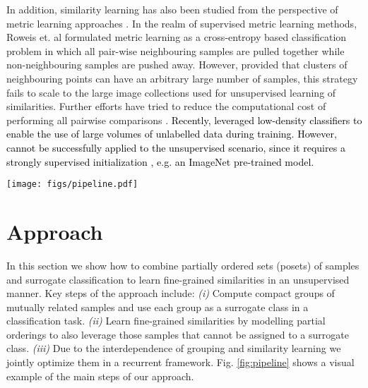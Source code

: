 \documentclass[10pt,twocolumn,letterpaper]{article}
\begin{document}
In addition, similarity learning has also been studied from the perspective of metric learning approaches \cite{wsabie,nca,magnet}. In the realm of supervised metric learning methods, Roweis et. al \cite{nca} formulated metric learning as a cross-entropy based classification problem in which all pair-wise neighbouring samples are pulled together while non-neighbouring samples are pushed away. However, provided that clusters of neighbouring points can have an arbitrary large number of samples, this strategy fails to scale to the large image collections used for unsupervised learning of similarities. Further efforts \cite{nca_ext1,nca_ext2} have tried to reduce the computational cost of performing all pairwise comparisons \cite{nmc}. \textcolor{black}{Recently, \cite{lowdensity} leveraged low-density classifiers to enable the use of large volumes of unlabelled data during training. However, \cite{lowdensity} cannot be successfully applied to the unsupervised scenario, since it requires a strongly supervised initialization , e.g. an ImageNet pre-trained model.}

\begin{figure*}[ht]
\texttt{[image: figs/pipeline.pdf]}
\caption{Visual summary of our approach. In the $\y$-steps the clustering procedure computes surrogate classes (shaded in color) based on the current representation. In the $\phi$-steps we learn a representation using the surrogate classes and partial orders of samples not assigned to any surrogate class (samples in white), by pulling them closer to their nearest classes and pushing them further from the rest.}
\label{fig:pipeline}
\end{figure*}












\section{Approach}

In this section we show how to combine partially ordered sets (posets) of samples and surrogate classification to learn fine-grained similarities in an unsupervised manner. Key steps of the approach include: \emph{(i)} Compute compact groups of mutually related samples and use each group as a surrogate class in a classification task. \emph{(ii)}  Learn fine-grained similarities by modelling partial orderings to also leverage those samples that cannot be assigned to a surrogate class. \emph{(iii)} Due to the interdependence of grouping and similarity learning we jointly optimize them in a recurrent framework. Fig. \ref{fig:pipeline} shows a visual example of the main steps of our approach.
\end{document}
